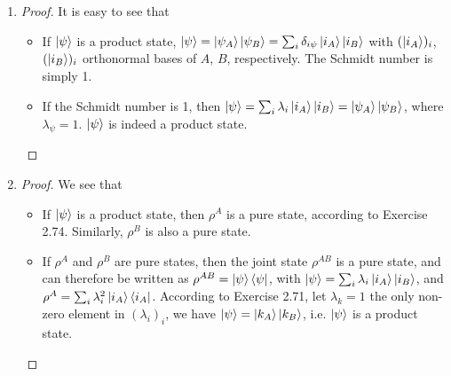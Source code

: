 \documentclass[../main.tex]{subfiles}
\begin{document}
\bigskip
\begin{exercise}
\end{exercise}
\begin{enumerate}
    \item 
    \begin{proof}
        It is easy to see that
        \begin{itemize}
            \item If $\ket{\psi}$ is a product state, $\ket{\psi}=\ket{\psi_A}\ket{\psi_B}=\sum_i \delta_{i\psi}\ket{i_A}\ket{i_B}$ with $(\ket{i_A})_i$, $(\ket{i_B})_i$ orthonormal bases of $A$, $B$, respectively. The Schmidt number is simply 1.
            \item If the Schmidt number is 1, then $\ket{\psi}=\sum_i \lambda_i\ket{i_A}\ket{i_B}=\ket{\psi_A}\ket{\psi_B}$, where $\lambda_\psi=1$. $\ket{\psi}$ is indeed a product state.
        \end{itemize}
    \end{proof}
    \item
    \begin{proof}
        We see that
        \begin{itemize}
            \item If $\ket{\psi}$ is a product state, then $\rho^A$ is a pure state, according to Exercise 2.74. Similarly, $\rho^B$ is also a pure state.
            \item If $\rho^A$ and $\rho^B$ are pure states, then the joint state $\rho^{AB}$ is a pure state, and can therefore be written as $\rho^{AB}=\ket{\psi}\bra{\psi}$, with $\ket{\psi}=\sum_i \lambda_i\ket{i_A}\ket{i_B}$, and $\rho^A=\sum_i\lambda_i^2\ket{i_A}\bra{i_A}$. According to Exercise 2.71, let $\lambda_k=1$ the only non-zero element in $(\lambda_i)_i$, we have $\ket{\psi}=\ket{k_A}\ket{k_B}$, i.e. $\ket{\psi}$ is a product state.
        \end{itemize}
    \end{proof}
\end{enumerate}
\end{document}
